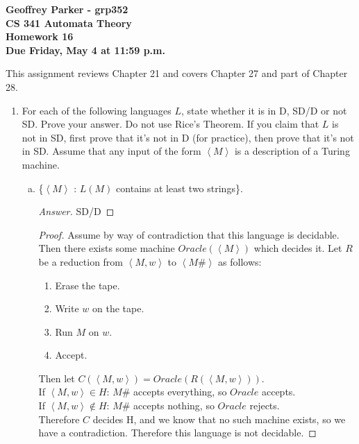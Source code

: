 \documentclass[10pt]{article}
\newcommand{\brackets}[1]{\left< #1 \right>}
\begin{document}
\begin{flushleft}
\textbf{\noindent
Geoffrey Parker - grp352\\
CS 341 Automata Theory \\
Homework 16 \\
Due Friday, May 4 at 11:59 p.m.}\\
\end{flushleft}

\noindent
This assignment reviews Chapter 21 and covers Chapter 27 and part of Chapter 28.\\

\begin{enumerate}[1)]


\item
For each of the following languages $L$, state whether it is in D, SD/D or not SD.  Prove your answer.  Do not use
Rice’s Theorem.  If you claim that $L$ is not in SD, first prove that it’s not in D (for practice), then prove that it’s not
in SD.  Assume that any input of the form $\brackets{M}$ is a description of a Turing machine.
\begin{enumerate}[a)]
\item
\{$\brackets{M}$ : $L(M)$ contains at least two strings\}.
\begin{proof}[Answer]
SD/D
\end{proof}
\begin{proof}[Proof]
Assume by way of contradiction that this language is decidable.  Then there exists some machine $Oracle(\brackets{M})$ which decides it.  Let $R$ be a reduction from $\brackets{M, w}$ to $\brackets{M\#}$ as follows:
\begin{enumerate}[1.]
\item
Erase the tape.
\item
Write $w$ on the tape.
\item
Run $M$ on $w$.
\item
Accept.
\end{enumerate}
Then let $C(\brackets{M, w}) = Oracle(R(\brackets{M, w}))$.\\
If $\brackets{M, w} \in H$: $M\#$ accepts everything, so $Oracle$ accepts.\\
If $\brackets{M, w} \not \in H$: $M\#$ accepts nothing, so $Oracle$ rejects.\\
Therefore $C$ decides H, and we know that no such machine exists, so we have a contradiction.  Therefore this language is not decidable.
\end{proof}

\end{enumerate}
\end{enumerate}
\end{document}
